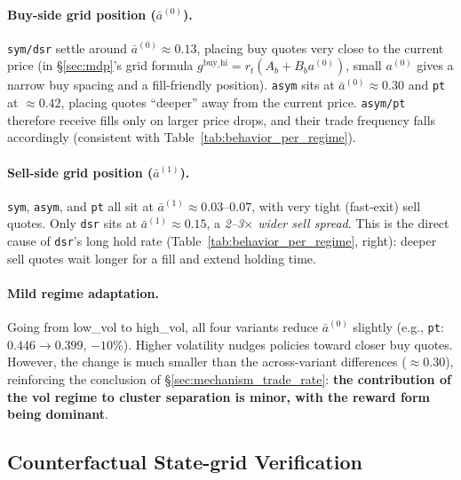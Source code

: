 \documentclass[11pt, a4paper]{article}
\begin{document}
\paragraph{Buy-side grid position ($\bar{a}^{(0)}$).}
\texttt{sym/dsr} settle around $\bar{a}^{(0)} \approx 0.13$, placing buy quotes
very close to the current price (in \S\ref{sec:mdp}'s grid formula
$g^{\mathrm{buy\_hi}} = r_t(A_b + B_b a^{(0)})$, small $a^{(0)}$ gives a
narrow buy spacing and a fill-friendly position). \texttt{asym} sits at
$\bar{a}^{(0)} \approx 0.30$ and \texttt{pt} at $\approx 0.42$, placing quotes
``deeper'' away from the current price. \texttt{asym/pt} therefore receive
fills only on larger price drops, and their trade frequency falls accordingly
(consistent with Table~\ref{tab:behavior_per_regime}).

\paragraph{Sell-side grid position ($\bar{a}^{(1)}$).}
\texttt{sym}, \texttt{asym}, and \texttt{pt} all sit at
$\bar{a}^{(1)} \approx 0.03$--$0.07$, with very tight (fast-exit) sell quotes.
Only \texttt{dsr} sits at $\bar{a}^{(1)} \approx 0.15$, a \emph{2--3$\times$
wider sell spread}. This is the direct cause of \texttt{dsr}'s long hold rate
(Table~\ref{tab:behavior_per_regime}, right): deeper sell quotes wait longer
for a fill and extend holding time.

\paragraph{Mild regime adaptation.}
Going from low\_vol to high\_vol, all four variants reduce $\bar{a}^{(0)}$
slightly (e.g., \texttt{pt}: $0.446 \to 0.399$, $-10\%$). Higher volatility
nudges policies toward closer buy quotes. However, the change is much smaller
than the across-variant differences ($\approx 0.30$), reinforcing the
conclusion of \S\ref{sec:mechanism_trade_rate}: \textbf{the contribution of
the vol regime to cluster separation is minor, with the reward form being
dominant}.

\subsection{Counterfactual State-grid Verification}
\label{sec:mechanism_counterfactual}
\end{document}
